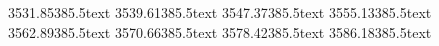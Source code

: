 %
%
%
%
%
%
%


          {35}{31.85}{38}{5.5}{text}
    {35}{39.61}{38}{5.5}{text}
       {35}{47.37}{38}{5.5}{text}
        {35}{55.13}{38}{5.5}{text}
    {35}{62.89}{38}{5.5}{text}
  {35}{70.66}{38}{5.5}{text}
     {35}{78.42}{38}{5.5}{text}
       {35}{86.18}{38}{5.5}{text}

